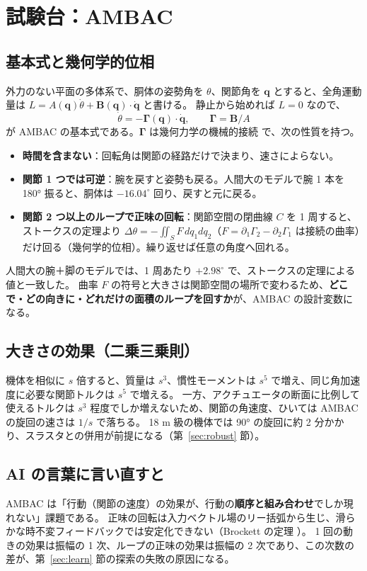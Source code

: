 \documentclass[paper=a4paper,fontsize=10pt,twocolumn,column_gap=2zw,line_length=24zw,number_of_lines=46,head_space=20mm]{jlreq}
\begin{document}
\section{試験台：AMBAC}\label{sec:ambac}

\subsection{基本式と幾何学的位相}
外力のない平面の多体系で、胴体の姿勢角を $\theta$、関節角を $\bm q$ とすると、全角運動量は $L = A(\bm q)\dot\theta + \bm B(\bm q)\cdot\dot{\bm q}$ と書ける。
静止から始めれば $L=0$ なので、
\begin{equation}
\dot\theta = -\bm\Gamma(\bm q)\cdot\dot{\bm q},\qquad \bm\Gamma = \bm B/A
\label{eq:ambac}
\end{equation}
が AMBAC の基本式である。$\bm\Gamma$ は幾何力学の機械的接続 \cite{marsden1992} で、次の性質を持つ。
\begin{itemize}\setlength{\itemsep}{0pt}
\item \textbf{時間を含まない}：回転角は関節の経路だけで決まり、速さによらない。
\item \textbf{関節 1 つでは可逆}：腕を戻すと姿勢も戻る。人間大のモデルで腕 1 本を 180° 振ると、胴体は $-16.04^\circ$ 回り、戻すと元に戻る。
\item \textbf{関節 2 つ以上のループで正味の回転}：関節空間の閉曲線 $C$ を 1 周すると、ストークスの定理より
$\Delta\theta = -\iint_S F\,dq_1dq_2$（$F=\partial_1\Gamma_2-\partial_2\Gamma_1$ は接続の曲率）だけ回る（幾何学的位相）。繰り返せば任意の角度へ回れる。
\end{itemize}
人間大の腕＋脚のモデルでは、1 周あたり $+2.98^\circ$ で、ストークスの定理による値と一致した。
曲率 $F$ の符号と大きさは関節空間の場所で変わるため、\textbf{どこで・どの向きに・どれだけの面積のループを回すか}が、AMBAC の設計変数になる。

\subsection{大きさの効果（二乗三乗則）}
機体を相似に $s$ 倍すると、質量は $s^3$、慣性モーメントは $s^5$ で増え、同じ角加速度に必要な関節トルクは $s^5$ で増える。
一方、アクチュエータの断面に比例して使えるトルクは $s^3$ 程度でしか増えないため、関節の角速度、ひいては AMBAC の旋回の速さは $1/s$ で落ちる。
18 m 級の機体では 90° の旋回に約 2 分かかり、スラスタとの併用が前提になる（第~\ref{sec:robust} 節）。

\subsection{AI の言葉に言い直すと}
AMBAC は「行動（関節の速度）の効果が、行動の\textbf{順序と組み合わせ}でしか現れない」課題である。
正味の回転は入力ベクトル場のリー括弧から生じ、滑らかな時不変フィードバックでは安定化できない（Brockett の定理 \cite{brockett1983}）。
1 回の動きの効果は振幅の 1 次、ループの正味の効果は振幅の 2 次であり、この次数の差が、第~\ref{sec:learn} 節の探索の失敗の原因になる。
\end{document}
